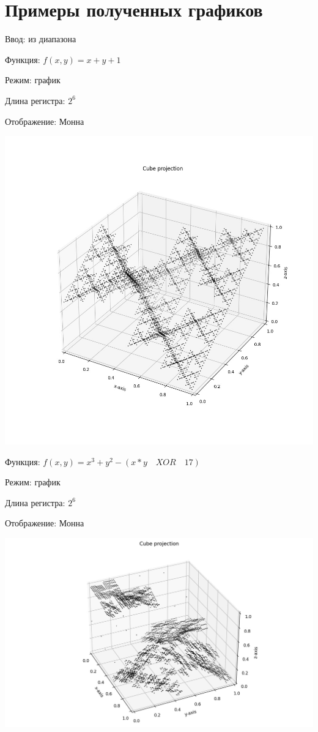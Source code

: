 \chapter{Примеры полученных графиков} \label{chapt3}

Ввод: из диапазона

Функция: $f (x, y) = x+y+1$

Режим: график

Длина регистра: $2^6$

Отображение: Монна

\includegraphics[scale=0.43]{gr1.jpg}

\newpage

Функция: $f(x, y) = x^3+y^2-(x*y \quad XOR \quad 17)$

Режим: график

Длина регистра: $2^6$

Отображение: Монна

\includegraphics[scale=0.43]{gr2.jpg}


